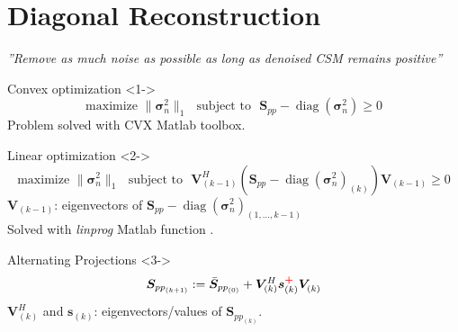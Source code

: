 \documentclass[9pt,xcolor=x11names,compress, notes=show]{beamer}%
\newcommand{\diag}[1]{\operatorname{diag}\left(#1\right)}
\newcommand{\citeTransp}[1]{\color{fg!50} \citep{#1}}
\begin{document}
\section{Diagonal Reconstruction}
\begin{frame}{\insertsectionhead}	
\textit{''Remove as much noise as possible as long as denoised CSM remains positive''}
	\begin{block}{Convex optimization   \citeTransp{Hald2017}}<1->
		\begin{equation*}
        			\text{maximize~} \| \bm{\sigma}_{n}^2\|_1 \text{~~subject to~~} \bm{S}_{pp}- \diag{\bm{\sigma}_n^2} \geq 0
		\end{equation*}
		Problem solved with CVX Matlab toolbox.
	\end{block}
	\begin{block}{Linear optimization \citeTransp{dougherty2016}}<2->
		\vspace{-0.2cm}
		\begin{equation*}
			\text{maximize~} \| \bm{\sigma}_{n}^2\|_1   \text{~~subject to~~}  \bm{V}^{H}_{(k-1)} \left( \bm{S}_{pp}- \diag{\bm{\sigma}_n^2}_{(k)} \right) \bm{V}_{(k-1)} \geq 0 
		\end{equation*}
		 $\bm{V}_{(k-1)}$: eigenvectors of $\bm{S}_{pp}-\diag{\bm{\sigma}_n^2}_{(1,...,k-1)} $\\[1pt]
		Solved with \textit{linprog} Matlab function .
	\end{block}
	\begin{block}{Alternating Projections  \citeTransp{leclere:hal-01279944}}<3->
		\begin{equation*}
        			 \bm{S}_{{pp}_{(k+1)}} := \bar{\bm{S}}_{{pp}_{(0)}} + \bm{V}^{H}_{(k)} \bm{s}_{(k)}^{\textcolor{red}{\textbf{+}}}\bm{V}^{~}_{(k)}
		\end{equation*}
		$\bm{V}^{H}_{(k)}$ and $\bm{s}_{(k)}$: eigenvectors/values of  $\bm{S}_{{pp}_{(k)}}$.\\[1pt]
	\end{block}	
\end{frame}

\end{document}
